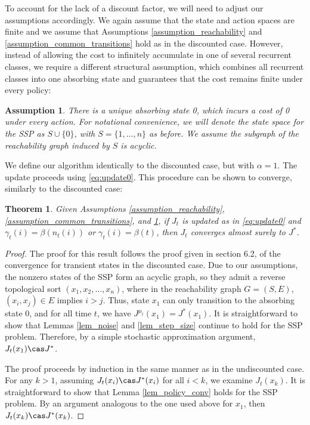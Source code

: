 \documentclass[12pt]{article}
\newtheorem{theorem}{Theorem}
\newtheorem{assumption}{Assumption}
\begin{document}
To account for the lack of a discount factor, we will need to adjust our assumptions accordingly. We again assume that the state and action spaces are finite and we assume that Assumptions \ref{assumption_reachability} and \ref{assumption_common_transitions} hold as in the discounted case. However, instead of allowing the cost to infinitely accumulate in one of several recurrent classes, we require a different structural assumption, which combines all recurrent classes into one absorbing state and guarantees that the cost remains finite under every policy:
\begin{assumption}\label{assumption_ssp}
	There is a unique absorbing state 0, which incurs a cost of 0 under every action. For notational convenience, we will denote the state space for the SSP as $S \cup \{0\}$, with $S = \{1, \ldots, n\}$ as before. We assume the subgraph of the reachability graph induced by $S$ is acyclic.
\end{assumption}

We define our algorithm identically to the discounted case, but with $\alpha = 1$. %
The update proceeds using \eqref{eq:update0}. This procedure can be shown to converge, similarly to the discounted case:

\begin{theorem}
	Given Assumptions \ref{assumption_reachability}, \ref{assumption_common_transitions}, and \ref{assumption_ssp}, if $J_t$ is updated as in \eqref{eq:update0} and $\gamma_t(i) = \beta(n_t(i))$ or $\gamma_t(i) = \beta(t)$, then $J_t$ converges almost surely to $J^*$.
\end{theorem}
\begin{proof}
	The proof for this result follows the proof given in section 6.2, of the convergence for transient states in the discounted case. Due to our assumptions, the nonzero states of the SSP form an acyclic graph, so they admit a reverse topological sort $(x_1, x_2, \ldots, x_n)$, where in the reachability graph $G = (S, E)$, $(x_i, x_j) \in E$ implies $i > j$. Thus, state $x_1$ can only transition to the absorbing state 0, and for all time $t$, we have $J^{\mu_t}(x_1) = J^*(x_1)$. It is straightforward to show that Lemmas \ref{lem_noise} and \ref{lem_step_size} continue to hold for the SSP problem. Therefore, by a simple stochastic approximation argument, $J_t(x_1) \cas J^*$.
	
	The proof proceeds by induction in the same manner as in the undiscounted case. For any $k > 1$, assuming $J_t(x_i) \cas J^*(x_i)$ for all $i < k$, we examine $J_t(x_k)$. It is straightforward to show that Lemma \ref{lem_policy_conv} holds for the SSP problem. By an argument analogous to the one used above for $x_1$, then $J_t(x_k) \cas J^*(x_k)$.
\end{proof}
\end{document}
